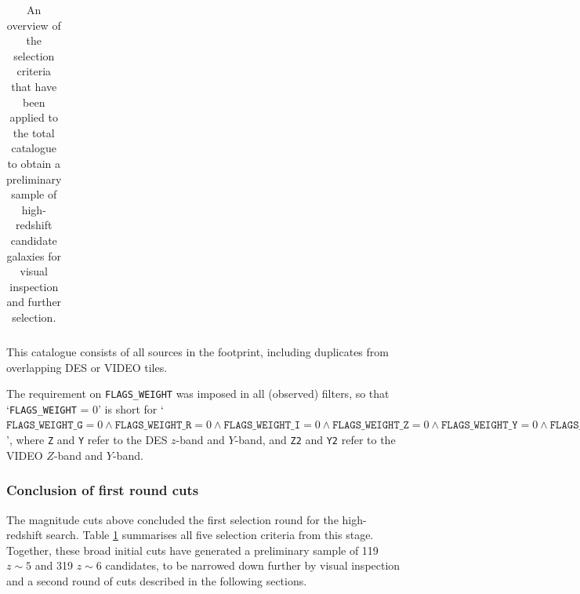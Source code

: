 {\begin{table}[p]
\begin{ThreePartTable}
\begin{tabular}{lcclc}
\bottomrule
\end{tabular}
\vspace{0.2em}
\begin{tablenotes}
{}\small
\item[i] This catalogue consists of all sources in the \DESVIDEO footprint, including duplicates from overlapping DES or VIDEO tiles.
\item[ii] The requirement on \texttt{FLAGS\_WEIGHT} was imposed in all (observed) filters, so that `\texttt{FLAGS\_WEIGHT} = 0' is short for `$\texttt{FLAGS\_WEIGHT\_G} = 0 \land \texttt{FLAGS\_WEIGHT\_R} = 0 \land \texttt{FLAGS\_WEIGHT\_I} = 0 \land \texttt{FLAGS\_WEIGHT\_Z} = 0 \land \texttt{FLAGS\_WEIGHT\_Y} = 0 \land \texttt{FLAGS\_WEIGHT\_Z2} = 0 \land \texttt{FLAGS\_WEIGHT\_Y2} = 0 \land \texttt{FLAGS\_WEIGHT\_J} = 0 \land \texttt{FLAGS\_WEIGHT\_H} = 0 \land \texttt{FLAGS\_WEIGHT\_K} = 0$', where \texttt{Z} and \texttt{Y} refer to the DES $z$-band and $Y$-band, and \texttt{Z2} and \texttt{Y2} refer to the VIDEO $Z$-band and $Y$-band. 
\end{tablenotes}
\vspace{1em}
\caption[Selection criteria for the first round of cuts]{An overview of the selection criteria that have been applied to the total \DESVIDEO catalogue to obtain a preliminary sample of high-redshift candidate galaxies for visual inspection and further selection.}\label{table:preliminary_cuts}
\end{ThreePartTable}
\end{table}
\clearpage
}


\subsubsection{Conclusion of first round cuts}\label{subsubsection:first_cuts_summary}
The magnitude cuts above concluded the first selection round for the high-redshift search. Table \ref{table:preliminary_cuts} summarises all five selection criteria from this stage. Together, these broad initial cuts have generated a preliminary sample of 119 $z\sim5$ and 319 $z\sim6$ candidates,  to be narrowed down further by visual inspection and a second round of cuts described in the following sections. \par 

